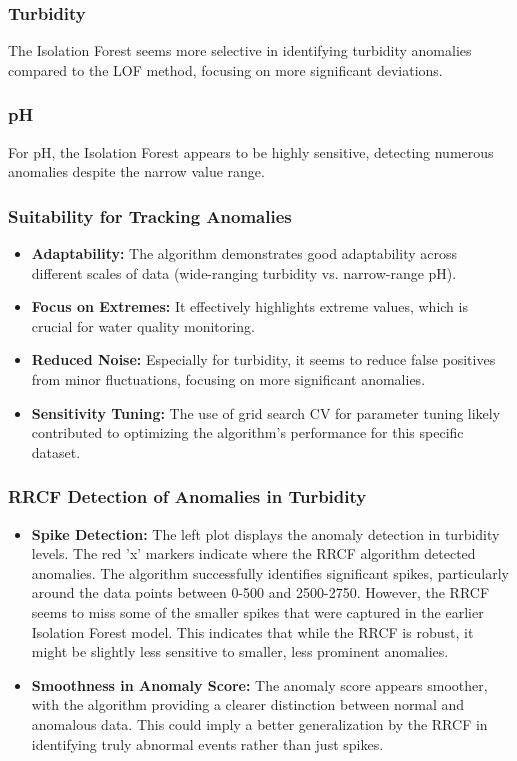 \documentclass[12pt]{report}
\begin{document}
\subsubsection{Turbidity}
The Isolation Forest seems more selective in identifying turbidity anomalies compared to the LOF method, focusing on more significant deviations.

\subsubsection{pH}
For pH, the Isolation Forest appears to be highly sensitive, detecting numerous anomalies despite the narrow value range.

\subsubsection{Suitability for Tracking Anomalies}
\begin{itemize}
    \item \textbf{Adaptability:} The algorithm demonstrates good adaptability across different scales of data (wide-ranging turbidity vs. narrow-range pH).
    \item \textbf{Focus on Extremes:} It effectively highlights extreme values, which is crucial for water quality monitoring.
    \item \textbf{Reduced Noise:} Especially for turbidity, it seems to reduce false positives from minor fluctuations, focusing on more significant anomalies.
    \item \textbf{Sensitivity Tuning:} The use of grid search CV for parameter tuning likely contributed to optimizing the algorithm's performance for this specific dataset.
\end{itemize}


\subsubsection{RRCF Detection of Anomalies in Turbidity}
\begin{itemize}
    \item \textbf{Spike Detection:} The left plot displays the anomaly detection in turbidity levels. The red 'x' markers indicate where the RRCF algorithm detected anomalies. The algorithm successfully identifies significant spikes, particularly around the data points between 0-500 and 2500-2750. However, the RRCF seems to miss some of the smaller spikes that were captured in the earlier Isolation Forest model. This indicates that while the RRCF is robust, it might be slightly less sensitive to smaller, less prominent anomalies.
    \item \textbf{Smoothness in Anomaly Score:} The anomaly score appears smoother, with the algorithm providing a clearer distinction between normal and anomalous data. This could imply a better generalization by the RRCF in identifying truly abnormal events rather than just spikes.
\end{itemize}
\end{document}
